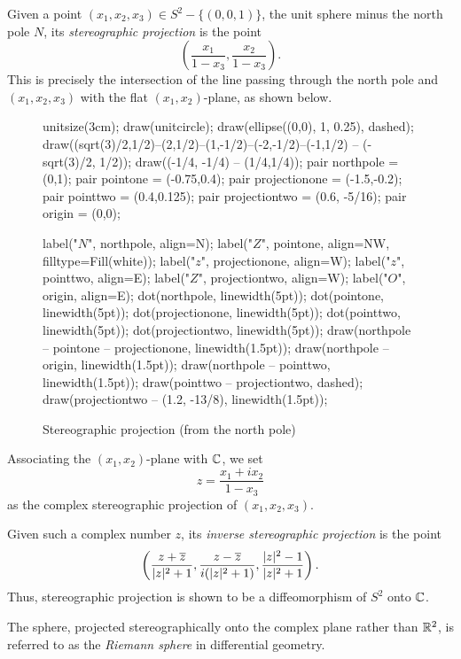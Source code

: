 \begin{definition}
	Given a point $(x_1,x_2,x_3) \in S^2-\{(0,0,1)\}$, the unit sphere minus the north pole $N$, its \emph{stereographic projection} is the point $$\left(\dfrac{x_1}{1-x_3},\dfrac{x_2}{1-x_3}\right).$$ This is precisely the intersection of the line passing through the north pole and $(x_1,x_2,x_3)$ with the flat $(x_1,x_2)$-plane, as shown below.
	
	\begin{figure}[h]
		\caption{Stereographic projection (from the north pole)}
		\centering
		\begin{asy}
		unitsize(3cm);
		draw(unitcircle);
		draw(ellipse((0,0), 1, 0.25), dashed);
		draw((sqrt(3)/2,1/2)--(2,1/2)--(1,-1/2)--(-2,-1/2)--(-1,1/2) -- (-sqrt(3)/2, 1/2));
		draw((-1/4, -1/4) -- (1/4,1/4));
		pair northpole = (0,1);
		pair pointone = (-0.75,0.4);
		pair projectionone = (-1.5,-0.2);
		pair pointtwo = (0.4,0.125);
		pair projectiontwo = (0.6, -5/16);
		pair origin = (0,0);
		
		label("$N$", northpole, align=N);
		label("$Z$", pointone, align=NW, filltype=Fill(white));
		label("$z$", projectionone, align=W);
		label("$z$", pointtwo, align=E);
		label("$Z$", projectiontwo, align=W);
		label("$O$", origin, align=E);
		dot(northpole, linewidth(5pt));
		dot(pointone, linewidth(5pt));
		dot(projectionone, linewidth(5pt));
		dot(pointtwo, linewidth(5pt));
		dot(projectiontwo, linewidth(5pt));
		draw(northpole -- pointone -- projectionone, linewidth(1.5pt));
		draw(northpole -- origin, linewidth(1.5pt));
		draw(northpole -- pointtwo, linewidth(1.5pt));
		draw(pointtwo -- projectiontwo, dashed);
		draw(projectiontwo -- (1.2, -13/8), linewidth(1.5pt));
		\end{asy}
	\end{figure}
	
	Associating the $(x_1,x_2)$-plane with $\mathbb C$, we set $$z=\dfrac{x_1+ix_2}{1-x_3}$$ as the complex stereographic projection of $(x_1,x_2,x_3)$.
	
	Given such a complex number $z$, its \textit{inverse stereographic projection} is the point $$\left(\dfrac{z+\overline{z}}{\lvert z \rvert^2+1},\dfrac{z-\overline{z}}{i(\lvert z \rvert^2+1)},\dfrac{\lvert z \rvert^2-1}{\lvert z \rvert^2+1}\right).$$ Thus, stereographic projection is shown to be a diffeomorphism of $S^2$ onto $\mathbb C$.
\end{definition}

The sphere, projected stereographically onto the complex plane rather than $\mathbb R^2$, is referred to as the \textit{Riemann sphere} in differential geometry.

